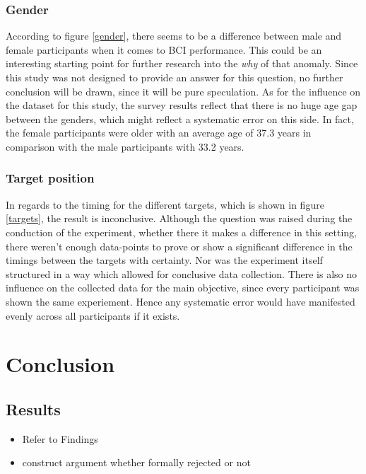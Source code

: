             \subsection{Gender}

                According to figure \ref*{gender}, there seems to be a difference between male and female participants when it comes to BCI performance. This could be an interesting starting point for further research into the \textit{why} of that anomaly. Since this study was not designed to provide an answer for this question, no further conclusion will be drawn, since it will be pure speculation. As for the influence on the dataset for this study, the survey results reflect that there is no huge age gap between the genders, which might reflect a systematic error on this side. In fact, the female participants were older with an average age of 37.3 years in comparison with the male participants with 33.2 years.

            \subsection{Target position}

                In regards to the timing for the different targets, which is shown in figure \ref*{targets}, the result is inconclusive. Although the question was raised during the conduction of the experiment, whether there it makes a difference in this setting, there weren't enough data-points to prove or show a significant difference in the timings between the targets with certainty. Nor was the experiment itself structured in a way which allowed for conclusive data collection. There is also no influence on the collected data for the main objective, since every participant was shown the same experiement. Hence any systematic error would have manifested evenly across all participants if it exists.

    \chapter{Conclusion}

        \section{Results}

            \begin{itemize}
                \item Refer to Findings
                \item construct argument whether formally rejected or not
            \end{itemize}

